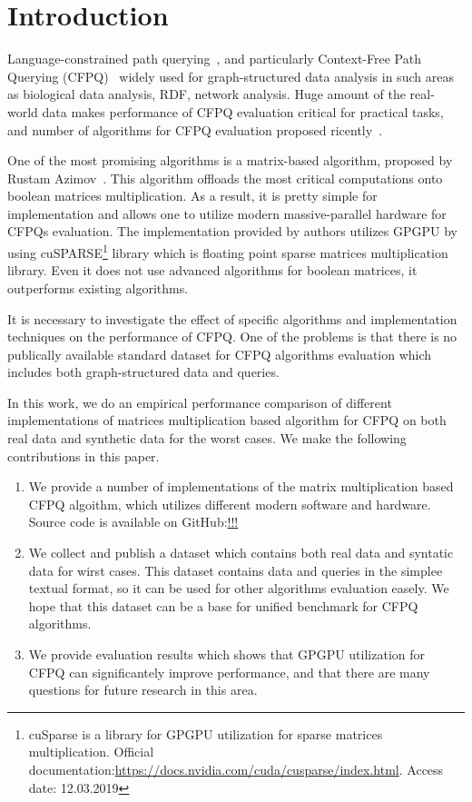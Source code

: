 \section{Introduction}

Language-constrained path querying~\cite{FLCpathProblem}, and particularly Context-Free Path Querying (CFPQ)~\cite{Yannakakis} widely used for graph-structured data analysis in such areas as biological data analysis, RDF, network analysis.
Huge amount of the real-world data makes performance of CFPQ evaluation critical for practical tasks, and number of algorithms for CFPQ evaluation proposed ricently~\cite{hellingsPathQuerying,Grigorev:2017:CPQ:3166094.3166104,Verbitskaia:2018:PCC:3241653.3241655,RDF,10.1007/978-3-319-91662-0_17,Medeiros:2018:EEC:3167132.3167265}.

One of the most promising algorithms is a matrix-based algorithm, proposed by Rustam Azimov~\cite{Azimov:2018:CPQ:3210259.3210264}.
This algorithm offloads the most critical computations onto boolean matrices multiplication.
As a result, it is pretty simple for implementation and allows one to utilize modern massive-parallel hardware for CFPQs evaluation.
The implementation provided by authors utilizes GPGPU by using cuSPARSE\footnote{cuSparse is a library for GPGPU utilization for sparse matrices multiplication. Official documentation:\url{https://docs.nvidia.com/cuda/cusparse/index.html}. Access date: 12.03.2019} library which is floating point sparse matrices multiplication library.
Even it does not use advanced algorithms for boolean matrices, it outperforms existing algorithms.

It is necessary to investigate the effect of specific algorithms and implementation techniques on the performance of CFPQ.
One of the problems is that there is no publically available standard dataset for CFPQ algorithms evaluation which includes both graph-structured data and queries.

In this work, we do an empirical performance comparison of different implementations of matrices multiplication based algorithm for CFPQ on both real data and synthetic data for the worst cases.
We make the following contributions in this paper.

\begin{enumerate}
\item We provide a number of implementations of the matrix multiplication based CFPQ algoithm, which utilizes different modern software and hardware.
Source code is available on GitHub:\url{!!!}
\item We collect and publish a dataset which contains both real data and syntatic data for wirst cases.
This dataset contains data and queries in the simplee textual format, so it can be used for other algorithms evaluation easely.
We hope that this dataset can be a base for unified benchmark for CFPQ algorithms.
\item We provide evaluation results which shows that GPGPU utilization for CFPQ can significantely improve performance, and that there are many questions for future research in this area.
\end{enumerate}
